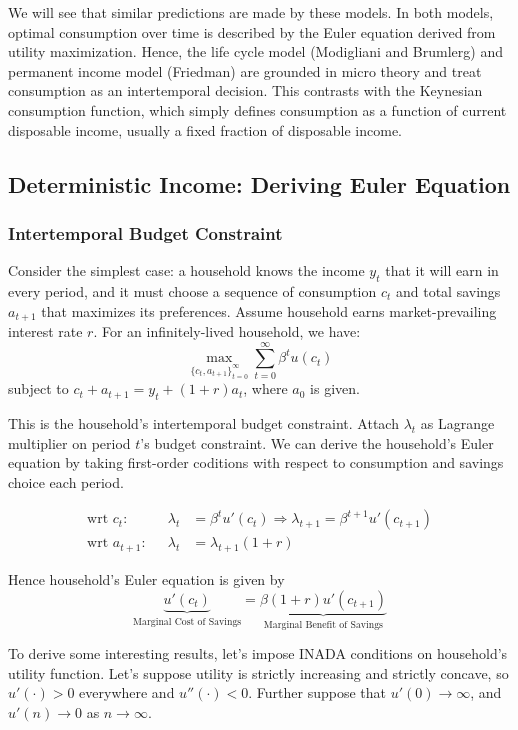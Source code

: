 \documentclass[11pt]{article}
\begin{document}
We will see that similar predictions are made by these models. In both models, optimal consumption over time is described by the Euler equation derived from utility maximization. Hence, the life cycle model (Modigliani and Brumlerg) and permanent income model (Friedman) are grounded in micro theory and treat consumption as an intertemporal decision. This contrasts with the Keynesian consumption function, which simply defines consumption as a function of current disposable income, usually a fixed fraction of disposable income.

\subsection{Deterministic Income: Deriving Euler Equation}
\subsubsection{Intertemporal Budget Constraint} \label{section:deterministicEuler-IBC}
Consider the simplest case: a household knows the income $y_t$ that it will earn in every period, and it must choose a sequence of consumption $c_t$ and total savings $a_{t+1}$ that maximizes its preferences. Assume household earns market-prevailing interest rate $r$. For an infinitely-lived household, we have: $$\max_{\{c_t, a_{t+1}\}_{t=0}^\infty} \sum_{t=0}^\infty \beta^t u(c_t)$$ subject to $c_t + a_{t+1} = y_t + (1+r)a_t$, where $a_0$ is given. 

This is the household's intertemporal budget constraint. Attach $\lambda_t$ as Lagrange multiplier on period $t$'s budget constraint. We can derive the household's Euler equation by taking first-order coditions with respect to consumption and savings choice each period.

\begin{align*}
    \text{wrt $c_t$:} && \lambda_t &= \beta^t u'(c_t) \Rightarrow \lambda_{t+1} = \beta^{t+1} u'(c_{t+1}) \\ 
    \text{wrt $a_{t+1}$:} && \lambda_t &= \lambda_{t+1}(1+r)
\end{align*}

Hence household's Euler equation is given by $$\underbrace{u'(c_t)}_{\text{Marginal Cost of Savings}} = \underbrace{\beta(1+r) u'(c_{t+1})}_{\text{Marginal Benefit of Savings}}$$

To derive some interesting results, let's impose INADA conditions on household's utility function. Let's suppose utility is strictly increasing and strictly concave, so $u'(\cdot) > 0$ everywhere and $u''(\cdot) < 0$. Further suppose that $u'(0) \to \infty$, and $u'(n) \to 0$ as $n \to \infty$.
\end{document}
